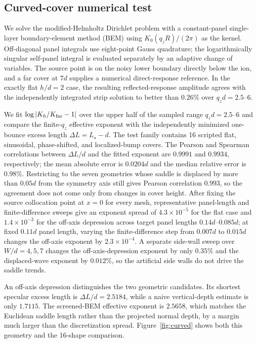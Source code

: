 \documentclass[aps,pra,twocolumn,superscriptaddress,longbibliography,nofootinbib,floatfix]{revtex4-2}
\theoremstyle{remark}
\begin{document}
\subsection{Curved-cover numerical test}

We solve the modified-Helmholtz Dirichlet problem with a constant-panel single-layer boundary-element method (BEM) using $K_0(q_zR)/(2\pi)$ as the kernel.  Off-diagonal panel integrals use eight-point Gauss quadrature; the logarithmically singular self-panel integral is evaluated separately by an adaptive change of variables.  The source point is on the noisy lower boundary directly below the ion, and a far cover at $7d$ supplies a numerical direct-response reference.  In the exactly flat $h/d=2$ case, the resulting reflected-response amplitude agrees with the independently integrated strip solution to better than $0.26\%$ over $q_zd=2.5$--$6$.

We fit $\log|K_h/K_{\rm far}-1|$ over the upper half of the sampled range $q_zd=2.5$--$6$ and compare the finite-$q_z$ effective exponent with the independently minimized one-bounce excess length $\Delta L=L_\star-d$.  The test family contains 16 scripted flat, sinusoidal, phase-shifted, and localized-bump covers.  The Pearson and Spearman correlations between $\Delta L/d$ and the fitted exponent are $0.9991$ and $0.9934$, respectively; the mean absolute error is $0.0204d$ and the median relative error is $0.98\%$.  Restricting to the seven geometries whose saddle is displaced by more than $0.05d$ from the symmetry axis still gives Pearson correlation $0.993$, so the agreement does not come only from changes in cover height.  After fixing the source collocation point at $x=0$ for every mesh, representative panel-length and finite-difference sweeps give an exponent spread of $4.3\times10^{-5}$ for the flat case and $1.4\times10^{-3}$ for the off-axis depression across target panel lengths $0.14d$--$0.085d$; at fixed $0.11d$ panel length, varying the finite-difference step from $0.007d$ to $0.015d$ changes the off-axis exponent by $2.3\times10^{-4}$.  A separate side-wall sweep over $W/d=4,5,7$ changes the off-axis-depression exponent by only $0.35\%$ and the displaced-wave exponent by $0.012\%$, so the artificial side walls do not drive the saddle trends.

An off-axis depression distinguishes the two geometric candidates.  Its shortest specular excess length is $\Delta L/d=2.5184$, while a naive vertical-depth estimate is only $1.7115$.  The screened-BEM effective exponent is $2.5658$, which matches the Euclidean saddle length rather than the projected normal depth, by a margin much larger than the discretization spread.  Figure~\ref{fig:curved} shows both this geometry and the 16-shape comparison.
\end{document}
